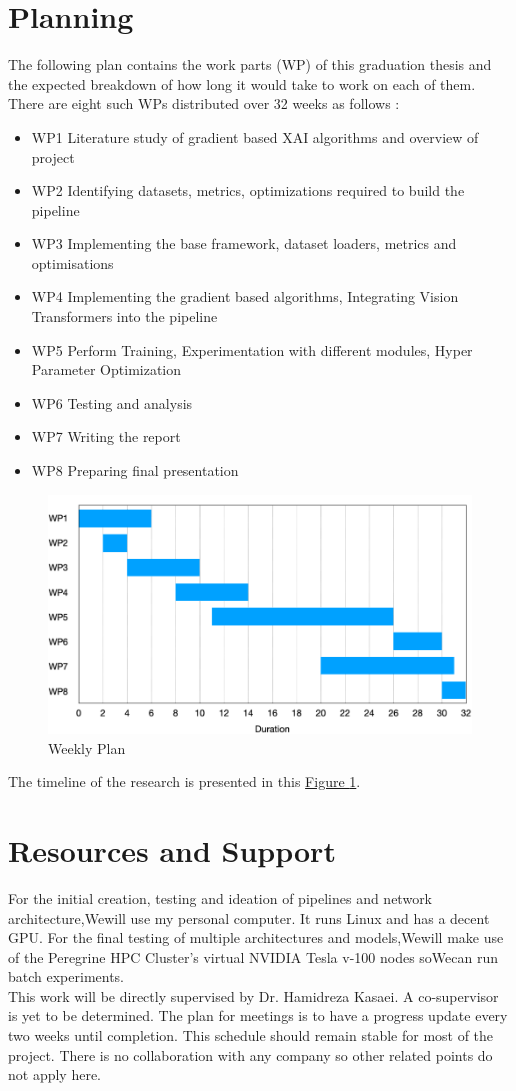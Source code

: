 \section{Planning} \label{section:plan}
The following plan contains the work parts (WP) of this graduation thesis and the expected breakdown of how long it would take to work on each of them. There are eight such WPs distributed over 32 weeks as follows : 
\begin{itemize}
    \item WP1	Literature study of gradient based XAI algorithms and overview of project
    \item WP2	Identifying datasets, metrics, optimizations required to build the pipeline
    \item WP3	Implementing the base framework, dataset loaders, metrics and optimisations
    \item WP4	Implementing the gradient based algorithms, Integrating Vision Transformers into the pipeline
    \item WP5	Perform Training, Experimentation with different modules, Hyper Parameter Optimization
    \item WP6	Testing and analysis
    \item WP7	Writing the report
    \item WP8	Preparing final presentation
\end{itemize}
\begin{figure}[!htbp]
  \centering
  \includegraphics[width=.8\textwidth]{images/gantt_chart.pdf}
  \caption{Weekly Plan}
  \label{fig:plan}
\end{figure}

The timeline of the research is presented in this \hyperref[fig:plan]{Figure \ref{fig:plan}}.

\section{Resources and Support}
For the initial creation, testing and ideation of pipelines and network architecture,Wewill use my personal computer. It runs Linux and has a decent GPU. For the final testing of multiple architectures and models,Wewill make use of the Peregrine HPC Cluster's virtual NVIDIA Tesla v-100 nodes soWecan run batch experiments.\\
This work will be directly supervised by Dr. Hamidreza Kasaei. A co-supervisor is yet to be determined. The plan for meetings is to have a progress update every two weeks until completion. This schedule should remain stable for most of the project. There is no collaboration with any company so other related points do not apply here.